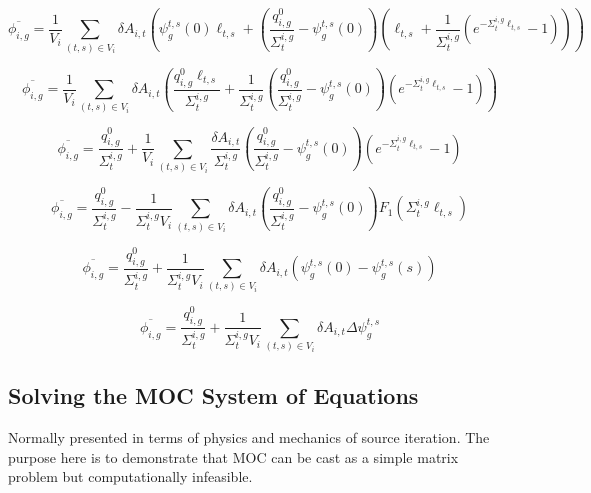 \begin{dmath}
	\overline{\phi_{i,g}} = \frac{1}{V_i} \sum_{(t,s) \in V_i} \delta A_{i,t} \left( \psi^{t,s}_g(0) \ell_{t,s} + \left( \frac{q^0_{i,g}}{\Sigma_{t}^{i,g}} - \psi_g^{t,s}(0) \right) \left( \ell_{t,s} + \frac{1}{\Sigma_{t}^{i,g}} \left( e^{-\Sigma_{t}^{i,g} \ell_{t,s}} - 1\right) \right) \right)
\end{dmath}

\begin{dmath}
	\overline{\phi_{i,g}} = \frac{1}{V_i} \sum_{(t,s) \in V_i} \delta A_{i,t} \left( \frac{q^0_{i,g} \ell_{t,s}}{\Sigma_{t}^{i,g}} + \frac{1}{\Sigma_{t}^{i,g}} \left( \frac{q^0_{i,g}}{\Sigma_{t}^{i,g}} - \psi_g^{t,s}(0) \right) \left( e^{-\Sigma_{t}^{i,g} \ell_{t,s}} - 1\right) \right)
\end{dmath}

\begin{dmath}
	\overline{\phi_{i,g}} = \frac{q^0_{i,g}}{\Sigma_{t}^{i,g}} + \frac{1}{V_i} \sum_{(t,s) \in V_i} \frac{\delta A_{i,t}}{\Sigma_{t}^{i,g}} \left( \frac{q^0_{i,g}}{\Sigma_{t}^{i,g}} - \psi_g^{t,s}(0) \right) \left( e^{-\Sigma_{t}^{i,g} \ell_{t,s}} - 1\right)
\end{dmath}

\begin{dmath}
	\overline{\phi_{i,g}} = \frac{q^0_{i,g}}{\Sigma_{t}^{i,g}} - \frac{1}{\Sigma_{t}^{i,g} V_i} \sum_{(t,s) \in V_i} \delta A_{i,t} \left( \frac{q^0_{i,g}}{\Sigma_{t}^{i,g}} - \psi_g^{t,s}(0) \right) F_1\left(\Sigma_{t}^{i,g} \ell_{t,s} \right)
\end{dmath}

\begin{dmath}
	\overline{\phi_{i,g}} = \frac{q^0_{i,g}}{\Sigma_{t}^{i,g}} + \frac{1}{\Sigma_{t}^{i,g} V_i} \sum_{(t,s) \in V_i} \delta A_{i,t} \left(\psi_g^{t,s}(0) - \psi_g^{t,s}(s) \right)
\end{dmath}

\begin{dmath}
	\overline{\phi_{i,g}} = \frac{q^0_{i,g}}{\Sigma_{t}^{i,g}} + \frac{1}{\Sigma_{t}^{i,g} V_i} \sum_{(t,s) \in V_i} \delta A_{i,t} \Delta \psi_g^{t,s}
\end{dmath}


\subsection{Solving the MOC System of Equations}

Normally presented in terms of physics and mechanics of source iteration. The purpose here is to demonstrate that MOC can be cast as a simple matrix problem but computationally infeasible.

